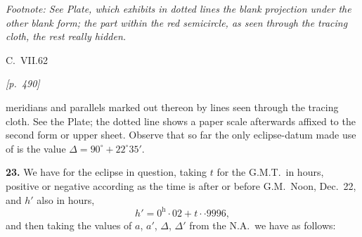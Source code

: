 \documentclass[11pt]{article}
\begin{document}
\medskip

\noindent\textit{Footnote: See Plate, which exhibits in dotted lines the
blank projection under the other blank form; the part within the red
semicircle, as seen through the tracing cloth, the rest really hidden.}

\medskip

\hfill C.\ VII.\hfill 62

\medskip

\noindent\textit{[p.~490]}

\medskip

meridians and parallels marked out thereon by lines seen through the
tracing cloth. See the Plate; the dotted line shows a paper scale
afterwards affixed to the second form or upper sheet. Observe that so
far the only eclipse-datum made use of is the value
$\Delta = 90^{\circ} + 22^{\circ}35'$.

\medskip

\textbf{23.} We have for the eclipse in question, taking $t$ for the
G.M.T.\ in hours, positive or negative according as the time is after or
before G.M.\ Noon, Dec.~22, and $h'$ also in hours,
\[
h' = 0^{\mathrm{h}}{\cdot}02 + t\cdot{\cdot}9996,
\]
and then taking the values of $a$, $a'$, $\Delta$, $\Delta'$ from the
N.A.\ we have as follows:

\medskip

\begin{center}
%
\end{center}
\end{document}
